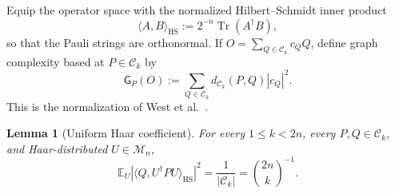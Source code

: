 \documentclass[twoside,10pt]{article}
\numberwithin{equation}{section}
\theoremstyle{slbody}
\newtheorem{lemma}[theorem]{Lemma}
\theoremstyle{definition}
\theoremstyle{remark}
\newcommand{\E}{\mathbb{E}}
\newcommand{\1}{\mathbf{1}}
\begin{document}
Equip the operator space with the normalized Hilbert--Schmidt inner product
\begin{equation}\label{eq:normalized-HS}
 \langle A,B\rangle_{\mathrm{HS}}:=2^{-n}\operatorname{Tr}(A^\dagger B),
\end{equation}
so that the Pauli strings are orthonormal.  If
$O=\sum_{Q\in\mathcal C_k}c_QQ$, define graph complexity based at
$P\in\mathcal C_k$ by
\begin{equation}\label{eq:graph-complexity-definition}
 \mathsf G_P(O):=\sum_{Q\in\mathcal C_k}
 d_{\mathcal C_k}(P,Q)|c_Q|^2.
\end{equation}
This is the normalization of West et al.~\cite[Eq.~(37)]{WestEtAl}.

\begin{lemma}[Uniform Haar coefficient]\label{lem:haar-coefficient}
For every $1\leq k<2n$, every $P,Q\in\mathcal C_k$, and Haar-distributed
$U\in\mathcal M_n$,
\[
 \E_U\left|\langle Q,U^\dagger P U\rangle_{\mathrm{HS}}\right|^2
 =\frac1{|\mathcal C_k|}
 =\binom{2n}{k}^{-1}.
\]
\end{lemma}
\end{document}
